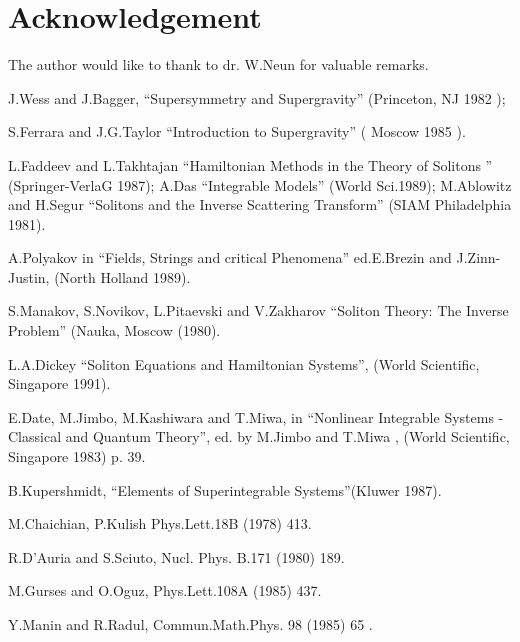\section{Acknowledgement}
        The author would like to thank to dr. W.Neun for valuable remarks.


\begin{thebibliography}{99}

\item{} J.Wess and J.Bagger, ``Supersymmetry and Supergravity''
        (Princeton, NJ 1982 );

\item{} S.Ferrara and J.G.Taylor ``Introduction to Supergravity''
        ( Moscow 1985 ).

\item{}  L.Faddeev and L.Takhtajan ``Hamiltonian Methods in the Theory of
        Solitons '' (Springer-VerlaG 1987); A.Das ``Integrable Models'' (World
        Sci.1989); M.Ablowitz and H.Segur ``Solitons and the Inverse
        Scattering Transform'' (SIAM Philadelphia 1981).

\item{}  A.Polyakov in ``Fields, Strings and critical Phenomena'' ed.E.Brezin and
        J.Zinn-Justin, (North Holland 1989).


\item{}   S.Manakov, S.Novikov, L.Pitaevski and V.Zakharov ``Soliton Theory: The
        Inverse Problem'' (Nauka, Moscow (1980).

\item{}  L.A.Dickey ``Soliton Equations and Hamiltonian Systems'', (World
        Scientific, Singapore 1991).

\item{}  E.Date, M.Jimbo, M.Kashiwara and T.Miwa, in ``Nonlinear Integrable
        Systems - Classical and Quantum Theory'', ed. by M.Jimbo and
        T.Miwa , (World Scientific, Singapore 1983) p. 39.


\item{} B.Kupershmidt, ``Elements of Superintegrable Systems''(Kluwer 1987).

\item{} M.Chaichian, P.Kulish Phys.Lett.18B (1978) 413.

\item{} R.D'Auria and S.Sciuto, Nucl. Phys. B.171 (1980) 189.

\item{} M.Gurses and O.Oguz, Phys.Lett.108A (1985) 437.

\item{} Y.Manin and R.Radul, Commun.Math.Phys. 98 (1985) 65 .



\end{thebibliography}

